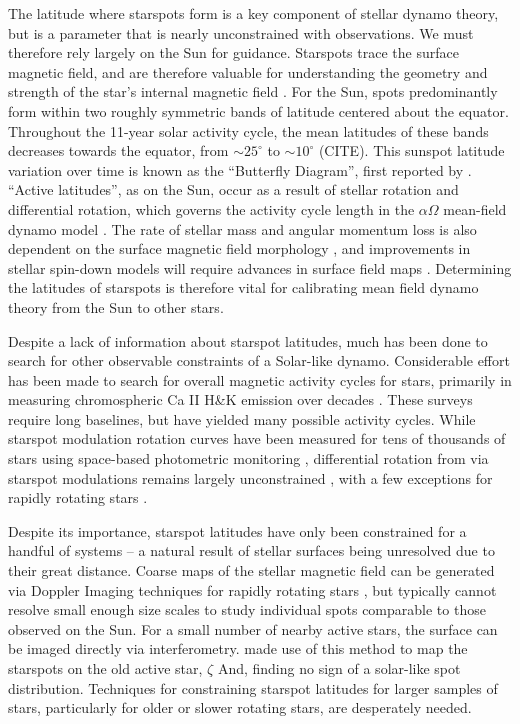 \documentclass[preprint2]{aastex61}
\begin{document}
The latitude where starspots form is a key component of stellar dynamo theory, but is a parameter that is nearly unconstrained with observations. We must therefore rely largely on the Sun for guidance. Starspots trace the surface magnetic field, and are therefore valuable for understanding the geometry and strength of the star's internal magnetic field \citep{berdyugina2005}.
For the Sun, spots predominantly form within two roughly symmetric bands of latitude centered about the equator. Throughout the 11-year solar activity cycle, the mean latitudes of these bands decreases towards the equator, from $\sim$$25^\circ$ to $\sim$$10^\circ$ (CITE). This sunspot latitude variation over time is known as the ``Butterfly Diagram'', first reported by \citet{maunder1904}.
``Active latitudes'', as on the Sun, occur as a result of stellar rotation and differential rotation, which governs the activity cycle length in the $\alpha\Omega$ mean-field dynamo model \citep{brandenburg2005}. The rate of stellar mass and angular momentum loss is also dependent on the surface magnetic field morphology \citep{garraffo2015}, and improvements in stellar spin-down models will require advances in surface field maps \citep{garraffo2016}.
Determining the latitudes of starspots is therefore vital for calibrating mean field dynamo theory from the Sun to other stars.


Despite a lack of information about starspot latitudes, much has been done to search for other observable constraints of a Solar-like dynamo.
Considerable effort has been made to search for overall magnetic activity cycles for stars, primarily in measuring chromospheric Ca II H\&K emission over decades \citep[e.g.]{wilson1978,baliunas1995}. These surveys require long baselines, but have yielded many possible activity cycles. While starspot modulation rotation curves have been measured for tens of thousands of stars using space-based photometric monitoring \citep{mcquillan2014}, differential rotation from via starspot modulations remains largely unconstrained \citep{aigrain2015}, with a few exceptions for rapidly rotating stars \citep[e.g.][]{davenport2015b}. 


Despite its importance, starspot latitudes have only been constrained for a handful of systems -- a natural result of stellar surfaces being unresolved due to their great distance. 
Coarse maps of the stellar magnetic field can be generated via Doppler Imaging techniques for rapidly rotating stars \citep{semel1989,donati_brown1997}, but typically cannot resolve small enough size scales to study individual spots comparable to those observed on the Sun.
For a small number of nearby active stars, the surface can be imaged directly via interferometry. \cite{roettenbacher2016} made use of this method to map the starspots on the old active star, $\zeta$ And, finding no sign of a solar-like spot distribution. Techniques for constraining starspot latitudes for larger samples of stars, particularly for older or slower rotating stars, are desperately needed.
\end{document}
